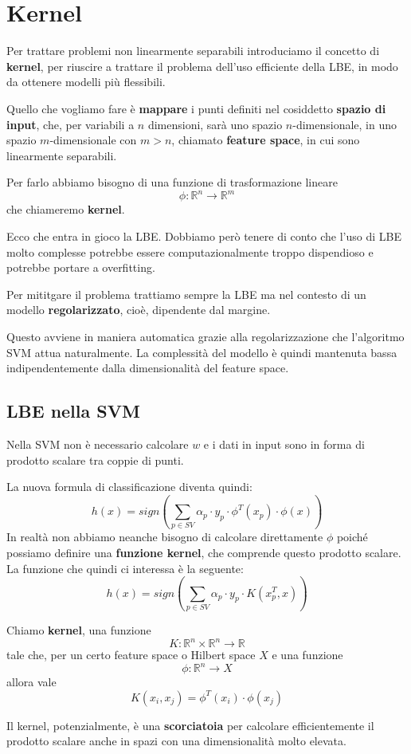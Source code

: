 \section{Kernel}
Per trattare problemi non linearmente separabili introduciamo il concetto di \textbf{kernel}, per riuscire a trattare il
problema dell'uso efficiente della LBE, in modo da ottenere modelli pi\`u flessibili.

Quello che vogliamo fare \`e \textbf{mappare} i punti definiti nel cosiddetto \textbf{spazio di input}, che, per variabili a
$n$ dimensioni, sar\`a uno spazio $n$-dimensionale, in uno spazio $m$-dimensionale con $m > n$, chiamato
\textbf{feature space}, in cui sono linearmente separabili.

Per farlo abbiamo bisogno di una funzione di trasformazione lineare
\[ \phi : \mathbb{R}^n \rightarrow \mathbb{R}^m \]
che chiameremo \textbf{kernel}.

Ecco che entra in gioco la LBE. Dobbiamo per\`o tenere di conto che l'uso di LBE molto complesse potrebbe essere
computazionalmente troppo dispendioso e potrebbe portare a overfitting.

Per mititgare il problema trattiamo sempre la LBE ma nel contesto di un modello \textbf{regolarizzato}, cio\`e, dipendente
dal margine.

Questo avviene in maniera automatica grazie alla regolarizzazione che l'algoritmo SVM attua naturalmente. La complessit\`a
del modello \`e quindi mantenuta bassa indipendentemente dalla dimensionalit\`a del feature space.

\subsection{LBE nella SVM}
Nella SVM non \`e necessario calcolare $w$ e i dati in input sono in forma di prodotto scalare tra coppie di punti.

La nuova formula di classificazione diventa quindi:
\[ h(x) = sign \left( \sum_{p \in SV} \alpha_p \cdot y_p \cdot \phi^T(x_p) \cdot \phi(x)  \right) \]
In realt\`a non abbiamo neanche bisogno di calcolare direttamente $\phi$ poich\'e possiamo definire una
\textbf{funzione kernel}, che comprende questo prodotto scalare. La funzione che quindi ci interessa \`e la seguente:
\[ h(x) = sign \left( \sum_{p \in SV} \alpha_p \cdot y_p \cdot K(x_p^T, x) \right) \]

\begin{definition}
	Chiamo \textbf{kernel}, una funzione
	\[ K : \mathbb{R}^n \times \mathbb{R}^n \rightarrow \mathbb{R} \]
	tale che, per un certo feature space o Hilbert space $X$ e una funzione
	\[ \phi : \mathbb{R}^n \rightarrow X \]
	allora vale
	\[ K(x_i, x_j) = \phi^T(x_i) \cdot \phi(x_j) \]
\end{definition}
Il kernel, potenzialmente, \`e una \textbf{scorciatoia} per calcolare efficientemente il prodotto scalare anche in spazi con
una dimensionalit\`a molto elevata.

